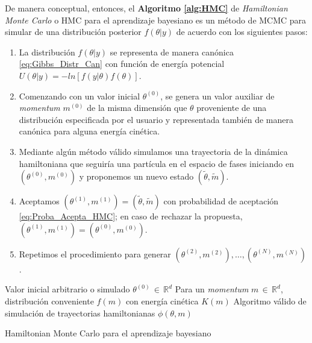 De manera conceptual, entonces, el \textbf{Algoritmo \ref{alg:HMC}} de \textit{Hamiltonian Monte Carlo} o HMC para el aprendizaje bayesiano es un método de MCMC para simular de una distribución posterior $f(\theta|y)$ de acuerdo con los siguientes pasos: 
\begin{enumerate}
\item La distribución $f(\theta|y)$ se representa de manera canónica \eqref{eq:Gibbs_Distr_Can} con función de energía potencial $U(\theta|y)=-ln\left[f(y|\theta)f(\theta)\right]$.
\item Comenzando con un valor inicial $\theta^{(0)}$, se genera un valor auxiliar de \textit{momentum} $m^{(0)}$ de la misma dimensión que $\theta$ proveniente de una distribución especificada por el usuario y representada también de manera canónica para alguna energía cinética.
\item Mediante algún método válido simulamos una trayectoria de la dinámica hamiltoniana que seguiría una partícula en el espacio de fases iniciando en $(\theta^{(0)},m^{(0)})$ y proponemos un nuevo estado $(\tilde{\theta},\tilde{m})$.
\item Aceptamos $(\theta^{(1)},m^{(1)})=(\tilde{\theta},\tilde{m})$ con probabilidad de aceptación \eqref{eq:Proba_Acepta_HMC}; en caso de rechazar la propuesta, $(\theta^{(1)},m^{(1)})=(\theta^{(0)},m^{(0)})$. 
\item Repetimos el procedimiento para generar $(\theta^{(2)},m^{(2)}),\dots,(\theta^{(N)},m^{(N)})$.\\
\end{enumerate}

\begin{algorithm}
\DontPrintSemicolon
Valor inicial arbitrario o simulado $\theta^{(0)} \,\in\, \mathbb{R}^d$\;
Para un \textit{momentum} $m \,\in\, \mathbb{R}^d$, distribución conveniente $f(m)$ con energía cinética $K(m)$\;
Algoritmo válido de simulación de trayectorias hamiltonianas $\phi(\theta,m)$

\caption{Hamiltonian Monte Carlo para el aprendizaje bayesiano \label{alg:HMC}}
\end{algorithm}

